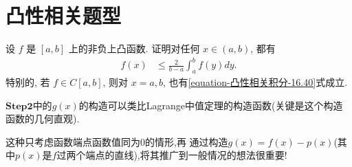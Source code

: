 \documentclass[../../main.tex]{subfiles}
\begin{document}
\section{凸性相关题型}

\begin{example}
设 $f$ 是 $[a,b]$ 上的非负上凸函数. 证明对任何 $x \in (a,b)$, 都有
\begin{align}\label{equation-凸性相关积分-16.40}
f(x) &\leqslant \frac{2}{b - a}\int_{a}^{b}f(y)dy.
\end{align}
特别的, 若 $f \in C[a,b]$, 则对 $x = a,b$, 也有\eqref{equation-凸性相关积分-16.40}式成立.
\end{example}
\begin{remark}
$\mathbf{Step}\mathbf{2}$中的$g(x)$的构造可以类比Lagrange中值定理的构造函数(关键是这个构造函数的几何直观).
\end{remark}
\begin{note}
这种只考虑函数端点函数值同为0的情形,再
通过构造$g(x)=f(x)-p(x)$(其中$p(x)$是$f$过两个端点的直线),将其推广到一般情况的想法很重要!
\end{note}
\end{document}
